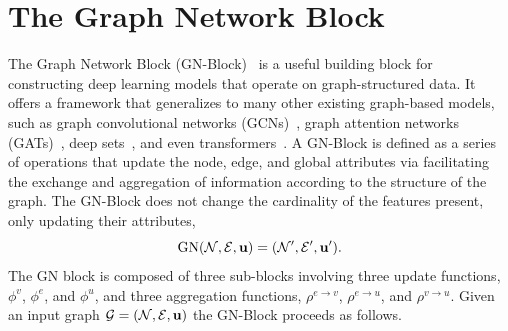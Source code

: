 \section{The Graph Network Block}
\label{sec:gn_block}

The Graph Network Block (GN-Block)~\cite{RelationalInductiveBiases} is a useful building block for constructing deep learning models that operate on graph-structured data.
It offers a framework that generalizes to many other existing graph-based models, such as graph convolutional networks (GCNs)~\cite{GCN}, graph attention networks (GATs)~\cite{GraphAttentionNetworks}, deep sets~\cite{DeepSets}, and even transformers~\cite{Attention}.
A GN-Block is defined as a series of operations that update the node, edge, and global attributes via facilitating the exchange and aggregation of information according to the structure of the graph.
The GN-Block does not change the cardinality of the features present, only updating their attributes,
\begin{equation}
    \text{GN}(\mathcal{N}, \mathcal{E}, \mathbf{u}) = (\mathcal{N}', \mathcal{E}', \mathbf{u}').
\end{equation}
The GN block is composed of three sub-blocks involving three update functions, $\phi^v$, $\phi^e$, and $\phi^u$, and three aggregation functions, $\rho^{e \to v}$, $\rho^{e \to u}$, and $\rho^{v \to u}$.
Given an input graph $\mathcal{G} = (\mathcal{N}, \mathcal{E}, \mathbf{u})$ the GN-Block proceeds as follows.


